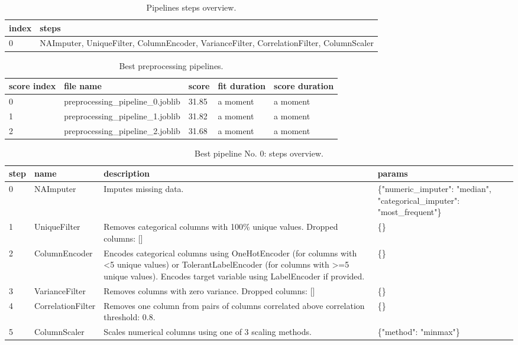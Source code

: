 \documentclass{article}%
\begin{document}
\begin{table}[H]%
\begin{center}%
\renewcommand{\arraystretch}{1.5}%
\begin{tabular}{p{20mm} p{160mm}}%
\hline%
\textbf{index}&\textbf{steps}\\%
\hline%
0&NAImputer, UniqueFilter, ColumnEncoder, VarianceFilter, CorrelationFilter, ColumnScaler\\%
\hline%
\end{tabular}%
\end{center}%
\caption{Pipelines steps overview.}%
\label{tab:pipelines_steps_overview}%
\end{table}

%


\begin{table}[H]%
\begin{center}%
\renewcommand{\arraystretch}{1.5}%
\begin{tabular}{l l l l l}%
\hline%
\textbf{score index}&\textbf{file name}&\textbf{score}&\textbf{fit duration}&\textbf{score duration}\\%
\hline%
0&preprocessing\_pipeline\_0.joblib&31.85&a moment&a moment\\%
1&preprocessing\_pipeline\_1.joblib&31.82&a moment&a moment\\%
2&preprocessing\_pipeline\_2.joblib&31.68&a moment&a moment\\%
\hline%
\end{tabular}%
\end{center}%
\caption{Best preprocessing pipelines.}%
\end{table}

%


\begin{table}[H]%
\begin{center}%
\renewcommand{\arraystretch}{1.5}%
\begin{tabular}{p{7mm} p{35mm} p{80mm} p{50mm}}%
\hline%
\textbf{step}&\textbf{name}&\textbf{description}&\textbf{params}\\%
\hline%
0&NAImputer&Imputes missing data.&\{"numeric\_imputer": "median", "categorical\_imputer": "most\_frequent"\}\\%
1&UniqueFilter&Removes categorical columns with 100\% unique values. Dropped columns: {[}{]}&\{\}\\%
2&ColumnEncoder&Encodes categorical columns using OneHotEncoder (for columns with <5 unique values) or TolerantLabelEncoder (for columns with >=5 unique values). Encodes target variable using LabelEncoder if provided.&\{\}\\%
3&VarianceFilter&Removes columns with zero variance. Dropped columns: {[}{]}&\{\}\\%
4&CorrelationFilter&Removes one column from pairs of columns correlated above correlation threshold: 0.8.&\{\}\\%
5&ColumnScaler&Scales numerical columns using one of 3 scaling methods.&\{"method": "minmax"\}\\%
\hline%
\end{tabular}%
\end{center}%
\caption{Best pipeline No. 0: steps overview.}%
\end{table}
\end{document}
